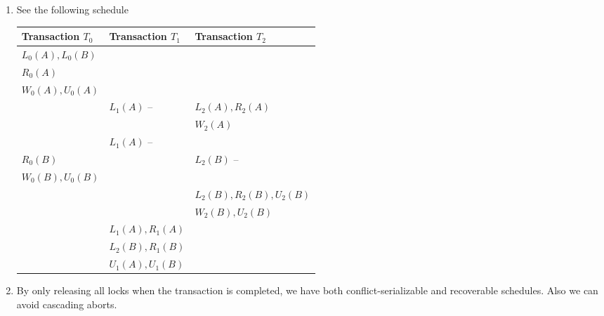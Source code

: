 \documentclass[10pt]{article}
\begin{document}
\begin{enumerate}
		\item See the following schedule
            \begin{center}
                \begin{tabularx}{\linewidth}{Y|Y|Y}
					Transaction $T_0$ & Transaction $T_1$ & Transaction $T_2$ \\ \hline
					$L_0(A), L_0(B)$ & & \\
					$R_0(A)$ & & \\
					$W_0(A), U_0(A)$ & & \\
					& $L_1(A)$ -- \color{red}{DENIED}& $L_2(A), R_2(A)$\\
					& & $W_2(A)$\\
					& $L_1(A)$ -- \color{red}{DENIED}& \\
					$R_0(B)$ &  & $L_2(B)$ -- \color{red}{DENIED}\\
					$W_0(B), U_0(B)$ &  & \\
					&  & $L_2(B), R_2(B), U_2(B)$\\
					&  & $W_2(B), U_2(B)$\\
					& $L_1(A), R_1(A)$ & \\
					& $L_2(B), R_1(B)$ & \\
					& $U_1(A), U_1(B)$ & \\
                \end{tabularx}
            \end{center}

		\item By only releasing all locks when the transaction is completed, we have both conflict-serializable and
			recoverable schedules. Also we can avoid cascading aborts.
	\end{enumerate}

\newpage
\end{document}
